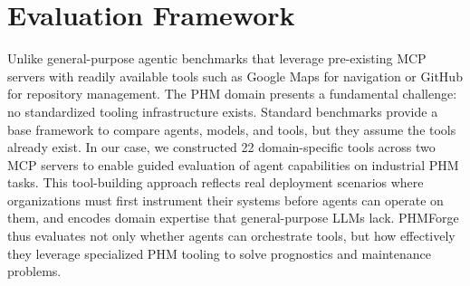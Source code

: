 \documentclass[sigconf,review]{acmart}
\begin{document}
\section{Evaluation Framework}   
Unlike general-purpose agentic benchmarks that leverage pre-existing MCP servers with readily available tools such as Google Maps for navigation or GitHub for repository management. The PHM domain presents a fundamental challenge: no standardized tooling infrastructure exists.                                                                 
  Standard benchmarks provide a base framework to compare agents, models, and tools, but   
  they                                                                                     
  assume the tools already exist. In our case, we constructed 22 domain-specific tools     
  across                                                                                   
  two MCP servers to enable guided evaluation of agent capabilities on industrial PHM      
  tasks.                                                                                   
  This tool-building approach reflects real deployment scenarios where organizations must  
  first                                                                                    
  instrument their systems before agents can operate on them, and encodes domain expertise 
  that general-purpose LLMs lack. PHMForge thus evaluates not only whether agents can      
  orchestrate tools, but how effectively they leverage specialized PHM tooling to solve    
  prognostics and maintenance problems.                                                    
                                                                                           
\end{document}
